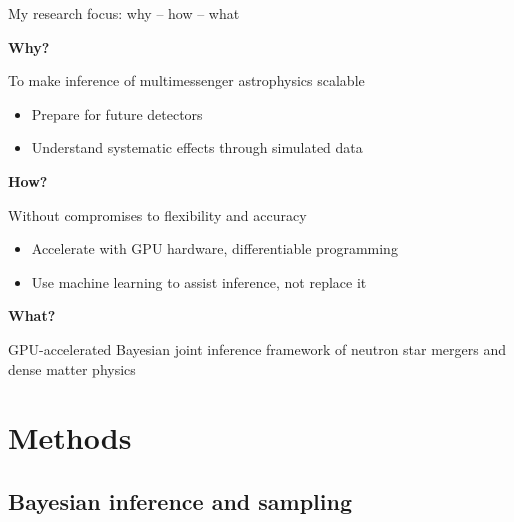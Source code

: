 \documentclass[usenames,dvipsnames,t]{beamer}
\begin{document}
\begin{frame}{My research focus: why -- how -- what}
  \def\x{4mm}
  \def\y{1mm}

  \textbf{Why?}

  To make inference of multimessenger astrophysics scalable

  \begin{itemize}
    \vspace{\y}
    \item Prepare for future detectors

    \vspace{\y}
    
    \item Understand systematic effects through simulated data
  \end{itemize}

  \vspace{\x}
  \pause

  \textbf{How?} 

  Without compromises to flexibility and accuracy

  \begin{itemize}
    \vspace{\y}
    \item Accelerate with GPU hardware, differentiable programming

    \vspace{\y}

    \item Use machine learning to assist inference, not replace it
  \end{itemize}

  \vspace{\x}
  \pause

  \textbf{What?}

  GPU-accelerated Bayesian joint inference framework of neutron star mergers and dense matter physics
\end{frame}


\section{Methods}

\subsection{Bayesian inference and sampling}
\end{document}
